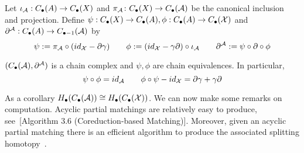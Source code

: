   Let $\iota_{\mathcal A}:C_\bullet(A)\to C_\bullet(X)$ and $\pi_{\mathcal A}\colon C_\bullet(X)\to C_\bullet({\mathcal A})$ be the canonical inclusion and projection.  Define $\psi:C_\bullet(X)\to C_\bullet(A), \phi:C_\bullet(A)\to C_\bullet({\mathcal X})$ and $\partial^{\mathcal A}:C_\bullet(A)\to C_{\bullet-1}({\mathcal A})$ by $$\psi:=\pi_{\mathcal A}\circ (id_{\mathcal X}-\partial \gamma) \quad\quad  \phi:= (id_{\mathcal X}-\gamma \partial)\circ \iota_{\mathcal A} \quad\quad \partial^{\mathcal A}:= \psi\circ \partial\circ \phi $$
 
  
 \begin{thm}\label{thm:focm:red}
 $(C_\bullet({\mathcal A}),\partial^{\mathcal A})$ is a chain complex and $\psi,\phi$ are chain equivalences.  In particular,
 \[
 \psi\circ \phi = id_{\mathcal A}\quad\quad \phi\circ\psi - id_{\mathcal X} = \partial\gamma+\gamma\partial
 \]
 \end{thm}
 
 As a corollary $H_\bullet(C_\bullet({\mathcal A}))\cong H_\bullet(C_\bullet({\mathcal X}))$.  We can now make some remarks on computation.  Acyclic partial matchings are relatively easy to produce, see~[Algorithm 3.6 (Coreduction-based Matching)]\cite{focm}.   Moreover, given an acyclic partial matching there is an efficient algorithm to produce the associated splitting homotopy~\cite[Algorithm 3.12 (Gamma Algorithm)]{focm}.  
 
 
 


